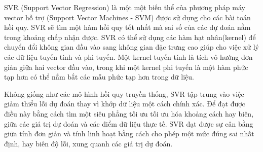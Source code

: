SVR (Support Vector Regression) là một một biến thể của phương pháp máy vector hỗ trợ (Support Vector Machines - SVM) được sử dụng cho các bài toán hồi quy. SVR sẽ tìm một hàm hồi quy tốt nhất mà sai số của các dự đoán nằm trong khoảng chấp nhận được. SVR có thể sử dụng các hàm hạt nhân(kernel) để chuyển đổi không gian đầu vào sang không gian đặc trưng cao giúp cho việc xử lý các dữ liệu tuyến tính và phi tuyến. Một kernel tuyến tính là tích vô hướng đơn giản giữa hai vector đầu vào, trong khi một kernel phi tuyến là một hàm phức tạp hơn có thể nắm bắt các mẫu phức tạp hơn trong dữ liệu. 

Không giống như các mô hình hồi quy truyền thống, SVR tập trung vào việc giảm thiểu lỗi dự đoán thay vì khớp dữ liệu một cách chính xác. Để đạt được điều này bằng cách tìm một siêu phẳng tối ưu tối ưu hóa khoảng cách hay biên, giữa các giá trị dự đoán và các điểm dữ liệu thực tế. SVR đạt được sự cân bằng giữa tính đơn giản và tính linh hoạt bằng cách cho phép một mức đúng sai nhất định, hay biên độ lỗi, xung quanh các giá trị dự đoán.


